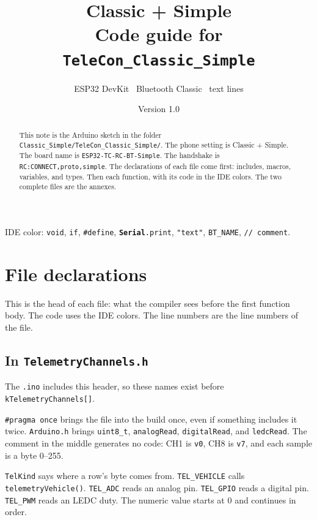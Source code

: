 \documentclass[11pt,a4paper]{article}
\title{Classic + Simple\\[0.25em]
\large Code guide for \texttt{TeleCon\_Classic\_Simple}}
\author{ESP32 DevKit \textperiodcentered\ Bluetooth Classic \textperiodcentered\ text lines}
\date{Version 1.0 \quad 2026}
\newcommand{\nm}[1]{\textcolor{ArduinoName}{\texttt{#1}}}
\newcommand{\fnm}[1]{\textcolor{ArduinoFunc}{\texttt{#1}}}
\newcommand{\typ}[1]{\textcolor{ArduinoType}{\texttt{#1}}}
\newcommand{\kw}[1]{\textcolor{ArduinoControl}{\texttt{#1}}}
\newcommand{\str}[1]{\textcolor{ArduinoString}{\texttt{#1}}}
\newcommand{\channelfile}{../../../ESP32_noCam/Classic_Simple/TeleCon_Classic_Simple/TelemetryChannels.h}
\newcommand{\hsnippet}[2]{%
  \par\addvspace{1.35em}%
}
\begin{document}
\maketitle

\begin{abstract}
This note is the Arduino sketch in the folder
\texttt{Classic\_Simple/TeleCon\_Classic\_Simple/}.
The phone setting is Classic + Simple. The board name is
\str{ESP32-TC-RC-BT-Simple}. The handshake is
\str{RC:CONNECT,proto,simple}.
The declarations of each file come first: includes, macros,
variables, and types. Then each function, with its code in the IDE
colors.
The two complete files are the annexes.
\end{abstract}

{\sffamily\scriptsize
IDE color:
\textcolor{ArduinoType}{\texttt{void}},
\textcolor{ArduinoControl}{\texttt{if}},
\textcolor{ArduinoControl}{\texttt{\#define}},
\textcolor{ArduinoFunc}{\textbf{\texttt{Serial}}}\textcolor{ArduinoFunc}{\texttt{.print}},
\textcolor{ArduinoString}{\texttt{"text"}},
\textcolor{ArduinoName}{\texttt{BT\_NAME}},
\textcolor{ArduinoComment}{\texttt{// comment}}.}

\tableofcontents
\clearpage

\section{File declarations}
\label{sec:decl}

This is the head of each file: what the compiler sees before the first
function body. The code uses the IDE colors. The line numbers are the
line numbers of the file.

\subsection{In \texttt{TelemetryChannels.h}}

The \texttt{.ino} includes this header, so these names exist before
\nm{kTelemetryChannels[]}.

\hsnippet{1}{15}

\kw{\#pragma once} brings the file into the build once, even if
something includes it twice. \texttt{Arduino.h} brings
\typ{uint8\_t}, \fnm{analogRead}, \fnm{digitalRead}, and
\fnm{ledcRead}. The comment in the middle generates no code: CH1
is \str{v0}, CH8 is \str{v7}, and each sample is a byte 0--255.

\hsnippet{17}{33}

\nm{TelKind} says where a row's byte comes from.
\nm{TEL\_VEHICLE} calls \fnm{telemetryVehicle()}.
\nm{TEL\_ADC} reads an analog pin. \nm{TEL\_GPIO} reads a digital
pin. \nm{TEL\_PWM} reads an LEDC duty. The numeric value starts at
0 and continues in order.
\end{document}
